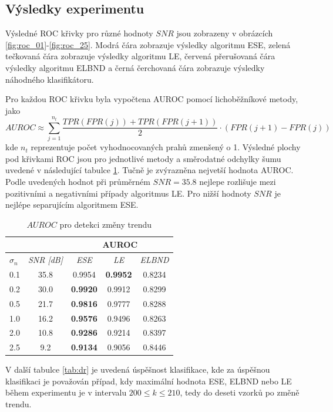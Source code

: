\subsection{Výsledky experimentu}
Výsledné ROC křivky pro různé hodnoty $SNR$ jsou zobrazeny v obrázcích \ref{fig:roc_01}-\ref{fig:roc_25}. Modrá čára zobrazuje výsledky algoritmu ESE, zelená tečkovaná čára zobrazuje výsledky algoritmu LE, červená přerušovaná čára výsledky algoritmu ELBND a černá čerchovaná čára zobrazuje výsledky náhodného klasifikátoru. 
\par 
Pro každou ROC křivku byla vypočtena AUROC pomocí lichoběžníkové metody, jako
\begin{equation}
AUROC \approx \sum_{j=1}^{n_t} \frac{TPR(FPR(j))+TPR(FPR(j+1))}{2} \cdot(FPR(j+1)-FPR(j))
\end{equation}
kde $n_t$ reprezentuje počet vyhodnocovaných prahů zmenšený o 1. Výsledné plochy pod křivkami ROC jsou pro jednotlivé metody a směrodatné odchylky šumu uvedené v následující tabulce \ref{tab:auroc}. Tučně je zvýrazněna nejvetší hodnota AUROC. Podle uvedených hodnot při průměrném $SNR=35.8$ nejlepe rozlišuje mezi pozitivními a negativními případy algoritmus LE. Pro nižší hodnoty $SNR$ je nejlépe separujícím algoritmem ESE.
\begin{table}[h!]

\caption{$AUROC$ pro detekci změny trendu}
\centering
\begin{tabular}{|l|c|c|c|c|}
\hline
\multicolumn{2}{|l|}{} & \multicolumn{3}{c|}{\textbf{AUROC}} \\ \hline
$\sigma_n$ & \textit{SNR [dB]} & \textit{ESE} & \textit{LE} & \textit{ELBND} \\ \hline
0.1 & 35.8 & 0.9954 & \textbf{0.9952} & 0.8234\\ \hline
0.2 & 30.0 & \textbf{0.9920} & 0.9912 & 0.8299 \\ \hline
0.5 & 21.7 & \textbf{0.9816} & 0.9777 & 0.8288 \\ \hline
1.0 & 16.2 & \textbf{0.9576} & 0.9496 & 0.8263 \\ \hline
2.0 & 10.8 & \textbf{0.9286} & 0.9214 & 0.8397 \\ \hline
2.5 & 9.2 & \textbf{0.9134} & 0.9056 & 0.8446 \\ \hline
\end{tabular}
\label{tab:auroc}
\end{table}
V další tabulce \ref{tab:dr} je uvedená úspěšnost klasifikace, kde za úspěšnou klasifikaci je považován případ, kdy maximální hodnota ESE, ELBND nebo LE během experimentu je v intervalu $200\leq k\leq210$, tedy do deseti vzorků po změně trendu.
